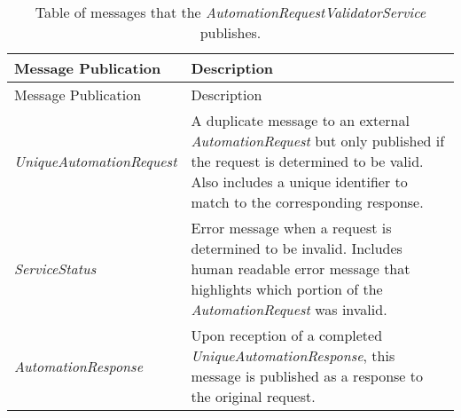 \begin{longtable}[c]{@{}ll@{}}
\caption{Table of messages that the
\emph{AutomationRequestValidatorService} publishes.}\tabularnewline
\toprule
\begin{minipage}[b]{0.29\columnwidth}\raggedright\strut
Message Publication
\strut\end{minipage} &
\begin{minipage}[b]{0.65\columnwidth}\raggedright\strut
Description
\strut\end{minipage}\tabularnewline
\midrule
\endfirsthead
\toprule
\begin{minipage}[b]{0.29\columnwidth}\raggedright\strut
Message Publication
\strut\end{minipage} &
\begin{minipage}[b]{0.65\columnwidth}\raggedright\strut
Description
\strut\end{minipage}\tabularnewline
\midrule
\endhead
\begin{minipage}[t]{0.29\columnwidth}\raggedright\strut
\emph{UniqueAutomationRequest}
\strut\end{minipage} &
\begin{minipage}[t]{0.65\columnwidth}\raggedright\strut
A duplicate message to an external \emph{AutomationRequest} but only
published if the request is determined to be valid. Also includes a
unique identifier to match to the corresponding response.
\strut\end{minipage}\tabularnewline
\begin{minipage}[t]{0.29\columnwidth}\raggedright\strut
\emph{ServiceStatus}
\strut\end{minipage} &
\begin{minipage}[t]{0.65\columnwidth}\raggedright\strut
Error message when a request is determined to be invalid. Includes human
readable error message that highlights which portion of the
\emph{AutomationRequest} was invalid.
\strut\end{minipage}\tabularnewline
\begin{minipage}[t]{0.29\columnwidth}\raggedright\strut
\emph{AutomationResponse}
\strut\end{minipage} &
\begin{minipage}[t]{0.65\columnwidth}\raggedright\strut
Upon reception of a completed \emph{UniqueAutomationResponse}, this
message is published as a response to the original request.
\strut\end{minipage}\tabularnewline
\bottomrule
\end{longtable}

